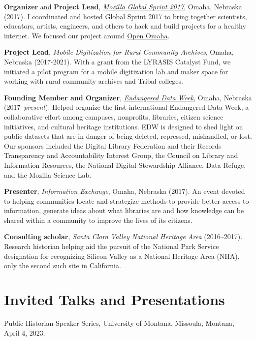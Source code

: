 \textbf{Organizer} and \textbf{Project Lead},
\emph{\href{https://mozilla.github.io/global-sprint/}{Mozilla Global
Sprint 2017}}, Omaha, Nebraska (2017). I coordinated and hosted Global
Sprint 2017 to bring together scientists, educators, artists, engineers,
and others to hack and build projects for a healthy internet. We focused
our project around \href{http://github.com/open-omaha/}{Open Omaha}.

\textbf{Project Lead}, \emph{Mobile Digitization for Rural Community
Archives}, Omaha, Nebraska (2017-2021). With a grant from the LYRASIS
Catalyst Fund, we initiated a pilot program for a mobile digitization
lab and maker space for working with rural community archives and Tribal
colleges.

\textbf{Founding Member and Organizer},
\emph{\href{http://endangereddataweek.org}{Endangered Data Week}},
Omaha, Nebraska (2017--\emph{present}). Helped organize the first
international Endangered Data Week, a collaborative effort among
campuses, nonprofits, libraries, citizen science initiatives, and
cultural heritage institutions. EDW is designed to shed light on public
datasets that are in danger of being deleted, repressed, mishandled, or
lost. Our sponsors included the Digital Library Federation and their
Records Transparency and Accountability Interest Group, the Council on
Library and Information Resources, the National Digital Stewardship
Alliance, Data Refuge, and the Mozilla Science Lab.

\textbf{Presenter}, \emph{Information Exchange}, Omaha, Nebraska (2017).
An event devoted to helping communities locate and strategize methods to
provide better access to information, generate ideas about what
libraries are and how knowledge can be shared within a community to
improve the lives of its citizens.

\textbf{Consulting scholar}, \emph{Santa Clara Valley National Heritage
Area} (2016--2017). Research historian helping aid the pursuit of the
National Park Service designation for recognizing Silicon Valley as a
National Heritage Area (NHA), only the second such site in California.

\section{Invited Talks and
Presentations}\label{invited-talks-and-presentations}

Public Historian Speaker Series, University of Montana, Missoula,
Montana, April 4, 2023.


